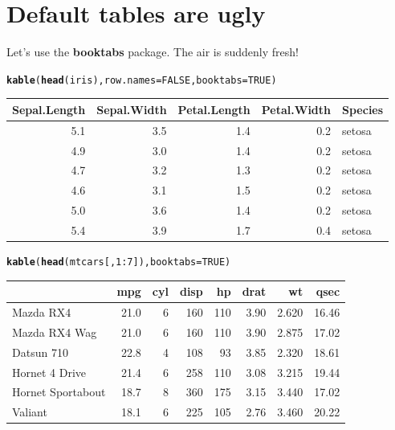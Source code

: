 \documentclass{article}\usepackage[]{graphicx}\usepackage[]{color}
\makeatletter
\newcommand{\hlfunctioncall}[1]{\textcolor[rgb]{0.501960784313725,0,0.329411764705882}{\textbf{#1}}}%
\newenvironment{kframe}{%
 \def\at@end@of@kframe{}%
 \ifinner\ifhmode%
  \def\at@end@of@kframe{\end{minipage}}%
  \begin{minipage}{\columnwidth}%
 \fi\fi%
 \def\FrameCommand##1{\hskip\@totalleftmargin \hskip-\fboxsep
 \colorbox{shadecolor}{##1}\hskip-\fboxsep
     \hskip-\linewidth \hskip-\@totalleftmargin \hskip\columnwidth}%
 \MakeFramed {\advance\hsize-\width
   \@totalleftmargin\z@ \linewidth\hsize
   \@setminipage}}%
 {\par\unskip\endMakeFramed%
 \at@end@of@kframe}
\makeatother
\begin{document}
\section{Default tables are ugly}

Let's use the \textbf{booktabs} package. The air is suddenly fresh!

\begin{kframe}
\begin{alltt}
\hlfunctioncall{kable}(\hlfunctioncall{head}(iris), row.names = FALSE, booktabs = TRUE)
\end{alltt}
\end{kframe}\begin{tabular}{rrrrl}
\toprule
Sepal.Length & Sepal.Width & Petal.Length & Petal.Width & Species\\
\midrule
5.1 & 3.5 & 1.4 & 0.2 & setosa\\
\midrule
4.9 & 3.0 & 1.4 & 0.2 & setosa\\
\midrule
4.7 & 3.2 & 1.3 & 0.2 & setosa\\
\midrule
4.6 & 3.1 & 1.5 & 0.2 & setosa\\
\midrule
5.0 & 3.6 & 1.4 & 0.2 & setosa\\
\midrule
5.4 & 3.9 & 1.7 & 0.4 & setosa\\
\bottomrule
\end{tabular}
\begin{kframe}\begin{alltt}
\hlfunctioncall{kable}(\hlfunctioncall{head}(mtcars[, 1:7]), booktabs = TRUE)
\end{alltt}
\end{kframe}\begin{tabular}{lrrrrrrr}
\toprule
  & mpg & cyl & disp & hp & drat & wt & qsec\\
\midrule
Mazda RX4 & 21.0 & 6 & 160 & 110 & 3.90 & 2.620 & 16.46\\
\midrule
Mazda RX4 Wag & 21.0 & 6 & 160 & 110 & 3.90 & 2.875 & 17.02\\
\midrule
Datsun 710 & 22.8 & 4 & 108 &  93 & 3.85 & 2.320 & 18.61\\
\midrule
Hornet 4 Drive & 21.4 & 6 & 258 & 110 & 3.08 & 3.215 & 19.44\\
\midrule
Hornet Sportabout & 18.7 & 8 & 360 & 175 & 3.15 & 3.440 & 17.02\\
\midrule
Valiant & 18.1 & 6 & 225 & 105 & 2.76 & 3.460 & 20.22\\
\bottomrule
\end{tabular}
\end{document}
